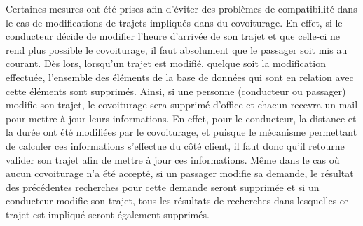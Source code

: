 \documentclass[12pt, a4paper, oneside]{article}
\begin{document}
        \indent Certaines mesures ont été prises afin d'éviter des problèmes de compatibilité dans le cas de modifications de trajets impliqués dans du covoiturage. En effet, si le conducteur décide de modifier l'heure d'arrivée de son trajet et que celle-ci ne rend plus possible le covoiturage, il faut absolument que le passager soit mis au courant. Dès lors, lorsqu'un trajet est modifié, quelque soit la modification effectuée, l'ensemble des éléments de la base de données qui sont en relation avec cette éléments sont supprimés. Ainsi, si une personne (conducteur ou passager) modifie son trajet, le covoiturage sera supprimé d'office et chacun recevra un mail pour mettre à jour leurs informations. En effet, pour le conducteur, la distance et la durée ont été modifiées par le covoiturage, et puisque le mécanisme permettant de calculer ces informations s'effectue du côté client, il faut donc qu'il retourne valider son trajet afin de mettre à jour ces informations. Même dans le cas où aucun covoiturage n'a été accepté, si un passager modifie sa demande, le résultat des précédentes recherches pour cette demande seront supprimée et si un conducteur modifie son trajet, tous les résultats de recherches dans lesquelles ce trajet est impliqué seront également supprimés.
        
\end{document}
